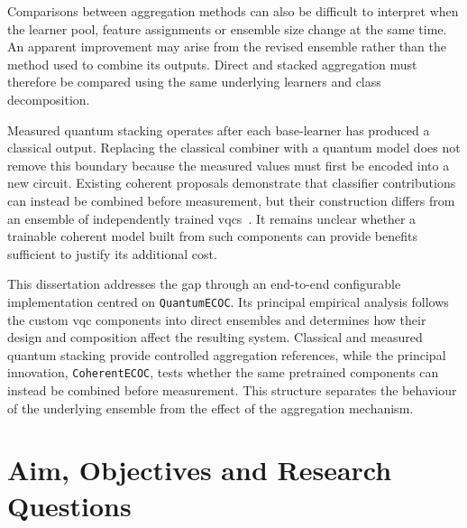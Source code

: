 \documentclass[]{UCD_CS_MSc_AAI_Report}
\begin{document}

Comparisons between aggregation methods can also be difficult to interpret when the learner pool, feature assignments or ensemble size change at the same time. An apparent improvement may arise from the revised ensemble rather than the method used to combine its outputs. Direct and stacked aggregation must therefore be compared using the same underlying learners and class decomposition.

Measured quantum stacking operates after each \gls{base-learner} has produced a classical output. Replacing the classical combiner with a quantum model does not remove this boundary because the measured values must first be encoded into a new circuit. Existing coherent proposals demonstrate that classifier contributions can instead be combined before measurement, but their construction differs from an ensemble of independently trained \acp{vqc}~\cite{schuld_quantum_2018,tolotti_weighted_2025}. It remains unclear whether a trainable coherent model built from such components can provide benefits sufficient to justify its additional cost.

This dissertation addresses the gap through an end-to-end configurable implementation centred on \texttt{QuantumECOC}. Its principal empirical analysis follows the custom \ac{vqc} components into direct ensembles and determines how their design and composition affect the resulting system. Classical and measured quantum stacking provide controlled aggregation references, while the principal innovation, \texttt{CoherentECOC}, tests whether the same pretrained components can instead be combined before measurement. This structure separates the behaviour of the underlying ensemble from the effect of the aggregation mechanism.

\section{Aim, Objectives and Research Questions}
\label{sec:intro-aim-rqs}
\end{document}
